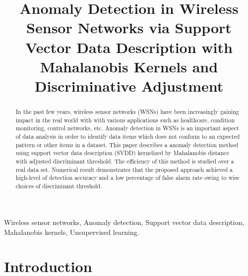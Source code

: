 \documentclass[conference]{IEEEtran}
\theoremstyle{problemstyle}
\begin{document}
\title{Anomaly Detection in Wireless Sensor Networks via Support Vector Data Description with Mahalanobis Kernels and Discriminative Adjustment}

\author{
\and
{}
}

\maketitle

\begin{abstract}

In the past few years, wireless sensor networks (WSNs) have been increasingly gaining impact in the real world with with various applications such as healthcare, condition monitoring, control networks, etc. Anomaly detection in WSNs is an important aspect of data analysis in order to identify data items which does not conform to an expected pattern or other items in a dataset. This paper describes a anomaly detection method using support vector data description (SVDD) kernelized by Mahalanobis distance with adjusted discriminant threshold. The efficiency of this method is studied over a real data set. Numerical result demonstrates that the proposed approach  achieved a high-level of detection accuracy and a low percentage of false alarm rate owing to wise choices of discriminant threshold.
\end{abstract}

\begin{IEEEkeywords}
Wireless sensor networks, Anomaly detection, Support vector data description, Mahalanobis kernels, Unsupervised learning.
\end{IEEEkeywords}

\IEEEpeerreviewmaketitle

\section{Introduction}
\end{document}
